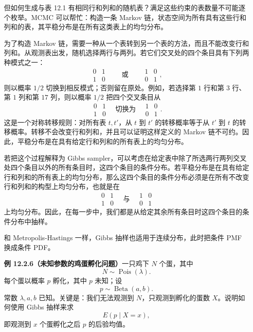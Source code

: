 \documentclass[UTF8, 12pt, fontset=fandol, oneside]{ctexart}
\begin{document}
但如何生成与表 12.1 有相同行和列和的随机表？满足这些约束的表数量不可能逐个枚举。MCMC 可以帮忙：构造一条 Markov 链，状态空间为所有具有这些行和列和的表，其平稳分布是在所有这类表上的均匀分布。

为了构造 Markov 链，需要一种从一个表转到另一个表的方法，而且不能改变行和列和。从观测表出发，随机选择两行与两列。若它们交叉处的四个条目具有下列两种模式之一：
\[
  \begin{matrix}0&1\\1&0\end{matrix}
  \qquad\text{或}\qquad
  \begin{matrix}1&0\\0&1\end{matrix},
\]
则以概率 $1/2$ 切换到相反模式；否则留在原处。例如，若选择第 $1$ 行和第 $3$ 行、第 $1$ 列和第 $17$ 列，则以概率 $1/2$ 把四个交叉条目从
\[
  \begin{matrix}0&1\\1&0\end{matrix}
  \quad\text{切换为}\quad
  \begin{matrix}1&0\\0&1\end{matrix}.
\]
这是一个对称转移规则：对所有表 $t,t'$，从 $t$ 到 $t'$ 的转移概率等于从 $t'$ 到 $t$ 的转移概率。转移不会改变行和列和，并且可以证明这样定义的 Markov 链不可约。因此，平稳分布是在具有给定行和列和的所有表上的均匀分布。

若把这个过程解释为 Gibbs sampler，可以考虑在给定表中除了所选两行两列交叉处四个条目以外的所有条目时，这四个条目的条件分布。若平稳分布是在具有给定行和列和的所有表上的均匀分布，那么这四个条目的条件分布必须是在所有不改变行和列和的构型上均匀分布，也就是在
\[
  \begin{matrix}0&1\\1&0\end{matrix}
  \quad\text{与}\quad
  \begin{matrix}1&0\\0&1\end{matrix}
\]
上均匀分布。因此，在每一步中，我们都是从给定其余所有条目时这四个条目的条件分布中抽样。

和 Metropolis-Hastings 一样，Gibbs 抽样也适用于连续分布，此时把条件 PMF 换成条件 PDF。

\noindent\textbf{例 12.2.6（未知参数的鸡蛋孵化问题）}\quad 一只鸡下 $N$ 个蛋，其中
\[
  N\sim\operatorname{Pois}(\lambda).
\]
每个蛋以概率 $p$ 孵化，其中 $p$ 未知；设
\[
  p\sim\operatorname{Beta}(a,b).
\]
常数 $\lambda,a,b$ 已知。关键是：我们无法观测到 $N$，只观测到孵化的蛋数 $X$。说明如何使用 Gibbs 抽样来求
\[
  E(p\mid X=x),
\]
即观测到 $x$ 个蛋孵化之后 $p$ 的后验均值。
\end{document}
